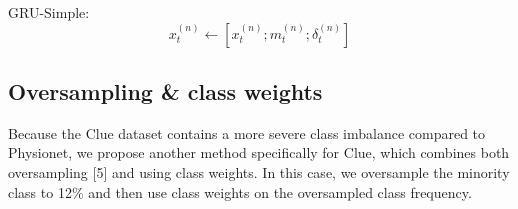 \documentclass{article}
\begin{document}
\noindent GRU-Simple: \begin{equation}
    x_{t}^{(n)} \xleftarrow{} [x_{t}^{(n)}; m_{t}^{(n)}; \delta_{t}^{(n)}]
\end{equation}

\vspace{0.5cm}
\subsection{\large Oversampling \& class weights}
Because the Clue dataset contains a more severe class imbalance compared to Physionet, we propose another method specifically for Clue, which combines both oversampling [5] and using class weights. In this case, 
 we oversample the minority class to 12$\%$ and then use class weights on the oversampled class frequency.
 
\newpage
\vspace{0.5cm}
\end{document}
